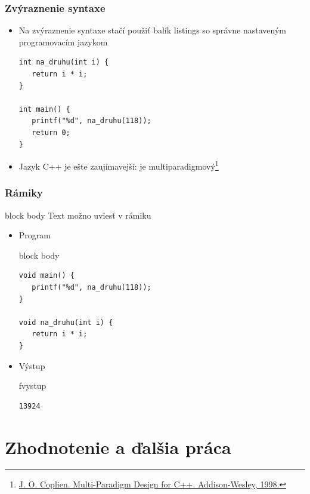 \documentclass{beamer}
\newcommand{\footcite}[1]{\footnote{\tiny #1}}
\newenvironment{program}{\begin{beamercolorbox}[rounded=true,shadow=true]{block body}\vspace{-4mm}}{\vspace{-2mm}\end{beamercolorbox}}
\newenvironment{vystup}{\begin{beamercolorbox}[rounded=true,shadow=true]{fvystup}}{\end{beamercolorbox}}
\newenvironment{poznamka}{\begin{beamercolorbox}[rounded=true,shadow=false]{block body}}{\end{beamercolorbox}}
\begin{document}
\begin{frame}[fragile=singleslide]\frametitle{Zvýraznenie syntaxe}
\begin{itemize}
\item Na zvýraznenie syntaxe stačí použiť balík listings so správne nastaveným programovacím jazykom
\begin{lstlisting}
int na_druhu(int i) {
   return i * i;
}

int main() {
   printf("%d", na_druhu(118));
   return 0;
}
\end{lstlisting}

\item Jazyk C++ je ešte zaujímavejší: je multiparadigmový\footcite{\url{J. O. Coplien. Multi-Paradigm Design for C++. Addison-Wesley, 1998.}}
\end{itemize}
\end{frame}


\begin{frame}[fragile=singleslide]\frametitle{Rámiky}
\begin{poznamka}
Text možno uviesť v rámiku
\end{poznamka}

\begin{itemize}
\item Program

\begin{program}
\begin{lstlisting}
void main() {
   printf("%d", na_druhu(118));
}

void na_druhu(int i) {
   return i * i;
}
\end{lstlisting}
\end{program}

\item Výstup
\begin{vystup}
\begin{lstlisting}
13924
\end{lstlisting}
\end{vystup}

\end{itemize}
\end{frame}



\section*{Zhodnotenie a ďalšia práca}
\end{document}
